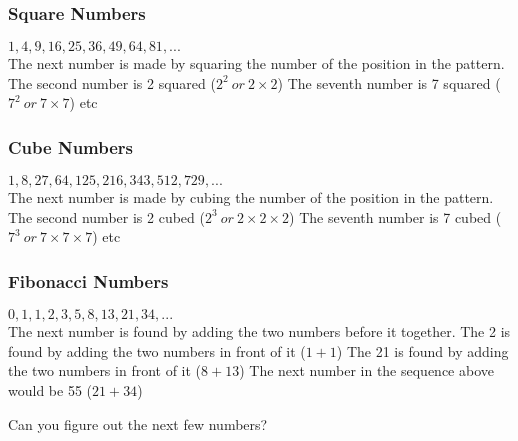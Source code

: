 \documentclass[10pt,a4paper,titlepage,twoside,openright]{report}
\begin{document}
\subsubsection{Square Numbers} 
  
$1, 4, 9, 16, 25, 36, 49, 64, 81, ...$\\

The next number is made by squaring the number of the position in the pattern.
The second number is 2 squared ($2^2~ or~ 2 \times 2$) 
The seventh number is 7 squared ($7^2~ or~ 7 \times 7$) etc 

\subsubsection{Cube Numbers} 

$1, 8, 27, 64, 125, 216, 343, 512, 729, ...$\\

The next number is made by cubing the number of the position in the pattern.
The second number is 2 cubed ($2^3~ or~2 \times 2 \times 2$) 
The seventh number is 7 cubed ($7^3~ or~ 7\times 7\times 7$) etc 

\subsubsection{Fibonacci Numbers} 

$0, 1, 1, 2, 3, 5, 8, 13, 21, 34, ...$\\

The next number is found by adding the two numbers before it together. 
The 2 is found by adding the two numbers in front of it ($1+1$) 
The 21 is found by adding the two numbers in front of it ($8+13$) 
The next number in the sequence above would be 55 ($21+34$)

Can you figure out the next few numbers? 
\end{document}
